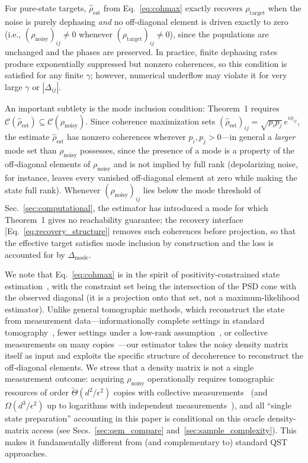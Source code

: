 \documentclass[12pt,a4paper]{article}
\newcommand{\CC}{\mathcal{C}}
\newcommand{\rhot}{\rho_\mathrm{target}}
\newcommand{\rhon}{\rho_\mathrm{noisy}}
\newcommand{\rhoe}{\hat{\rho}_\mathrm{est}}
\begin{document}
For pure-state targets, $\rhoe$ from Eq.~\eqref{eq:cohmax} exactly recovers $\rhot$ when the noise is purely dephasing \emph{and} no off-diagonal element is driven exactly to zero (i.e., $(\rhon)_{ij} \neq 0$ whenever $(\rhot)_{ij} \neq 0$), since the populations are unchanged and the phases are preserved.
In practice, finite dephasing rates produce exponentially suppressed but nonzero coherences, so this condition is satisfied for any finite $\gamma$; however, numerical underflow may violate it for very large $\gamma$ or $|\Delta_{ij}|$.

An important subtlety is the mode inclusion condition: Theorem~1 requires $\CC(\rhoe) \subseteq \CC(\rhon)$.
Since coherence maximization sets $(\rhoe)_{ij} = \sqrt{p_i p_j}\,e^{i\phi_{ij}}$, the estimate $\rhoe$ has nonzero coherences wherever $p_i, p_j > 0$---in general a \emph{larger} mode set than $\rhon$ possesses, since the presence of a mode is a property of the off-diagonal elements of $\rhon$ and is not implied by full rank (depolarizing noise, for instance, leaves every vanished off-diagonal element at zero while making the state full rank).
Whenever $(\rhon)_{ij}$ lies below the mode threshold of Sec.~\ref{sec:computational}, the estimator has introduced a mode for which Theorem~1 gives no reachability guarantee; the recovery interface [Eq.~\eqref{eq:recovery_structure}] removes such coherences before projection, so that the effective target satisfies mode inclusion by construction and the loss is accounted for by $\Delta_\mathrm{mode}$.

We note that Eq.~\eqref{eq:cohmax} is in the spirit of positivity-constrained state estimation~\cite{Hradil1997}, with the constraint set being the intersection of the PSD cone with the observed diagonal (it is a projection onto that set, not a maximum-likelihood estimator).
Unlike general tomographic methods, which reconstruct the state from measurement data---informationally complete settings in standard tomography~\cite{Hradil1997}, fewer settings under a low-rank assumption~\cite{Gross2010}, or collective measurements on many copies~\cite{Haah2017}---our estimator takes the noisy density matrix itself as input and exploits the specific structure of decoherence to reconstruct the off-diagonal elements.
We stress that a density matrix is not a single measurement outcome: acquiring $\rhon$ operationally requires tomographic resources of order $\tilde\Theta(d^2/\epsilon^2)$ copies with collective measurements~\cite{Haah2017,ODonnellWright2016} (and $\Omega(d^3/\epsilon^2)$ up to logarithms with independent measurements~\cite{Haah2017}), and all ``single state preparation'' accounting in this paper is conditional on this oracle density-matrix access (see Secs.~\ref{sec:qem_compare} and~\ref{sec:sample_complexity}).
This makes it fundamentally different from (and complementary to) standard QST approaches.
\end{document}
